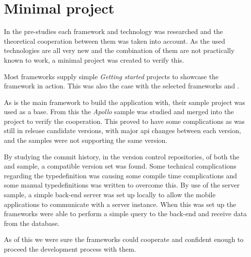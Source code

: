 \section{Minimal project}
In the pre-studies each framework and technology was researched and the theoretical cooperation between them was taken into account.
As the used technologies are all very new and the combination of them are not practically known to work, a minimal project was created to verify this.

Most frameworks supply simple \textit{Getting started} projects to showcase the framework in action.
This was also the case with the selected frameworks  \citep{minimalProject:sample:nativescript} and  \citep{minimalProject:sample:apollo}.

As  is the main framework to build the application with, their sample project was used as a base.
From this the \textit{Apollo} sample was studied and merged into the project to verify the cooperation.
This proved to have some complications as  was still in release candidate versions, with major \gls{api} changes between each version, and the samples were not supporting the same version.

By studying the commit history, in the  version control repositories, of both the  and  sample, a compatible version set was found.
Some technical complications regarding the \gls{typedefinition} was causing some compile time complications and some manual \glspl{typedefinition} was written to overcome this.
By use of the  server sample, a simple back-end server was set up locally to allow the mobile applications to communicate with a server instance.
When this was set up the frameworks were able to perform a simple query to the back-end and receive data from the database.

As of this we were sure the frameworks could cooperate and confident enough to proceed the development process with them.
